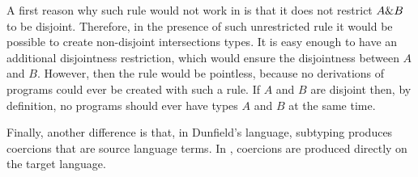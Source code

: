 \noindent A first reason why such rule would not work in \name is
that it does not restrict $A \& B$ to be disjoint. Therefore,
in the presence of such unrestricted rule it would be possible to 
create non-disjoint intersections types. It is easy
enough to have an additional disjointness restriction, which would 
ensure the disjointness between $A$ and $B$. However, then the rule 
would be pointless, because no derivations of programs could ever be
created with such a rule. If $A$ and $B$ are disjoint then, by
definition, no programs should ever have types $A$ and $B$ at 
the same time.

Finally, another difference is that, in Dunfield's language, subtyping produces
coercions that are source language terms. In \name, coercions are
produced directly on the target language.

